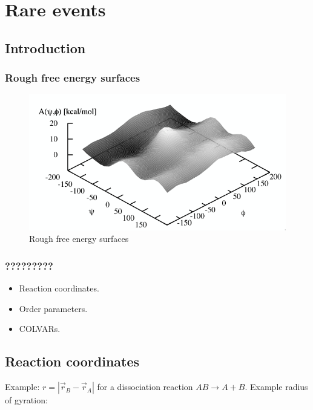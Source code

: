 \graphicspath{{chapters/19/images}}
\chapter{Rare events}

\section{Introduction}

	\subsection{Rough free energy surfaces}

	\begin{figure}[H]
		\includegraphics[width=\textwidth]{rough-free-energy-surfaces}
		\caption{Rough free energy surfaces}
		\label{fig:rough-free-energy-surfaces}
	\end{figure}

	\subsection{?????????}

		\begin{itemize}
			\item Reaction coordinates.
			\item Order parameters.
			\item COLVARs.
		\end{itemize}

\section{Reaction coordinates}
Example: $r = |\vec{r}_B-\vec{r}_A|$ for a dissociation reaction $AB\rightarrow A+B$.
Example radius of gyration:

